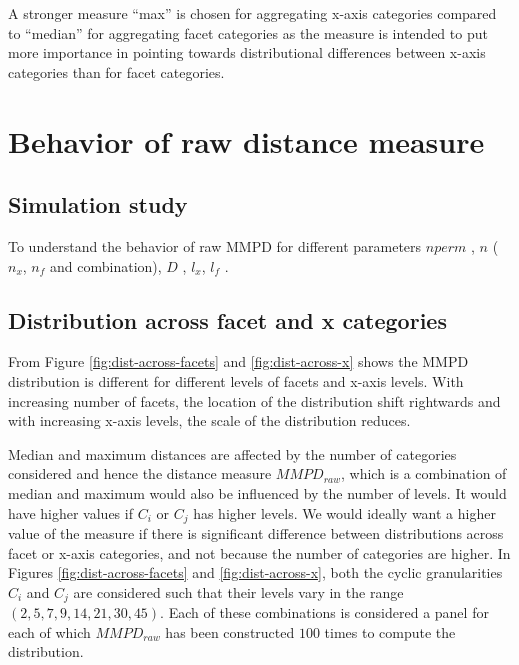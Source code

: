 \documentclass[
]{article}
\begin{document}
A stronger measure ``max'' is chosen for aggregating x-axis categories compared to ``median'' for aggregating facet categories as the measure is intended to put more importance in pointing towards distributional differences between x-axis categories than for facet categories.

\hypertarget{behavior-of-raw-distance-measure}{%
\section{Behavior of raw distance measure}\label{behavior-of-raw-distance-measure}}

\hypertarget{simulation-study}{%
\subsection{Simulation study}\label{simulation-study}}

To understand the behavior of raw MMPD for different parameters \(nperm\) , \(n\) (\(n_x\), \(n_f\) and combination), \(D\) , \(l_x\), \(l_f\) .

\hypertarget{distribution-across-facet-and-x-categories}{%
\subsection{Distribution across facet and x categories}\label{distribution-across-facet-and-x-categories}}

From Figure \ref{fig:dist-across-facets} and \ref{fig:dist-across-x} shows the MMPD distribution is different for different levels of facets and x-axis levels. With increasing number of facets, the location of the distribution shift rightwards and with increasing x-axis levels, the scale of the distribution reduces.

Median and maximum distances are affected by the number of categories considered and hence the distance measure \(MMPD_{raw}\), which is a combination of median and maximum would also be influenced by the number of levels. It would have higher values if \(C_i\) or \(C_j\) has higher levels. We would ideally want a higher value of the measure if there is significant difference between distributions across facet or x-axis categories, and not because the number of categories are higher. In Figures \ref{fig:dist-across-facets} and \ref{fig:dist-across-x}, both the cyclic granularities \(C_i\) and \(C_j\) are considered such that their levels vary in the range \((2, 5,7 ,9, 14, 21, 30, 45)\). Each of these combinations is considered a panel for each of which \(MMPD_{raw}\) has been constructed \(100\) times to compute the distribution.
\end{document}
